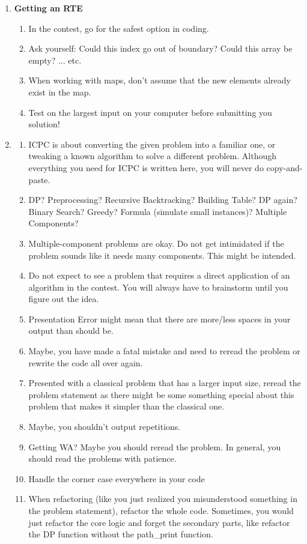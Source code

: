 \documentclass[12pt]{book}
\begin{document}
\begin{enumerate}
\item \textbf{Getting an RTE}
\begin{enumerate}[label = \roman*.]
\item In the contest, go for the safest option in coding.
\item Ask yourself: Could this index go out of boundary? Could this array be empty? ... etc.
\item When working with maps, don't assume that the new elements already exist in the map.
\item Test on the largest input on your computer before submitting you solution!
\end{enumerate}
\item
\begin{enumerate}[label = \roman*.]
\item ICPC is about converting the given problem into a familiar one, or tweaking a known algorithm to solve a different problem. Although everything you need for ICPC is written here, you will never do copy-and-paste.
\item DP? Preprocessing? Recursive Backtracking? Building Table? DP again? Binary Search? Greedy? Formula (simulate small instances)? Multiple Components?
\item Multiple-component problems are okay. Do not get intimidated if the problem sounds like it needs many components. This might be intended.
\item Do not expect to see a problem that requires a direct application of an algorithm in the contest. You will always have to brainstorm until you figure out the idea.
\item Presentation Error might mean that there are more/less spaces in your output than should be.
\item Maybe, you have made a fatal mistake and need to reread the problem or rewrite the code all over again.
\item Presented with a classical problem that has a larger input size, reread the problem statement as there might be some something special about this problem that makes it simpler than the classical one.
\item Maybe, you shouldn't output repetitions.
\item Getting WA? Maybe you should reread the problem. In general, you should read the problems with patience.
\item Handle the corner case everywhere in your code
\item When refactoring (like you just realized you misunderstood something in the problem statement), refactor the whole code. Sometimes, you would just refactor the core logic and forget the secondary parts, like refactor the DP function without the path\_print function.

\end{enumerate}
\end{enumerate}
\end{document}
